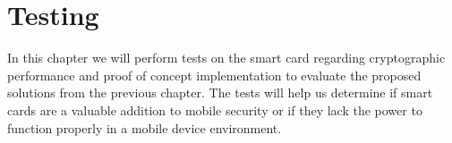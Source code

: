 \chapter{Testing}
In this chapter we will perform tests on the smart card regarding cryptographic performance and proof of concept implementation to evaluate the proposed solutions from the previous chapter. The tests will help us determine if smart cards are a valuable addition to mobile security or if they lack the power to function properly in a mobile device environment.







